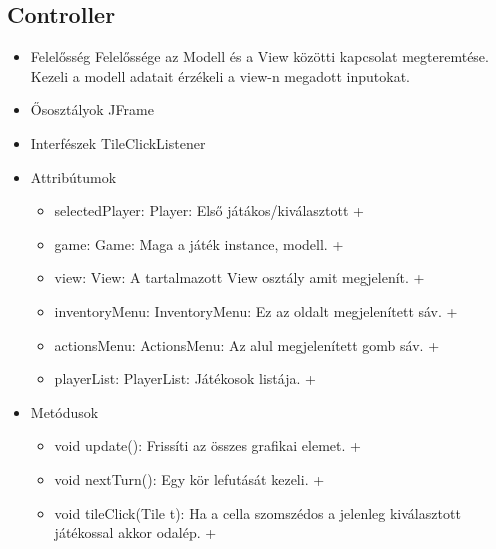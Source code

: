 \subsection{Controller}
\begin{itemize}
	\item Felelősség\newline
	Felelőssége az Modell és a View közötti kapcsolat megteremtése. Kezeli a modell adatait érzékeli a view-n megadott inputokat.
	\item Ősosztályok\newline
	JFrame
	\item Interfészek\newline
	TileClickListener
	\item Attribútumok\newline
	\begin{itemize}
		\item selectedPlayer: Player: Első játákos/kiválasztott +
		\item game: Game: Maga a játék instance, modell. +
		\item view: View: A tartalmazott View osztály amit megjelenít. +
		\item inventoryMenu: InventoryMenu: Ez az oldalt megjelenített sáv. +
		\item actionsMenu: ActionsMenu: Az alul megjelenített gomb sáv. +
		\item playerList: PlayerList: Játékosok listája. +	
	\end{itemize}
	\item Metódusok\newline
	\begin{itemize}
		\item void update(): Frissíti az összes grafikai elemet. +
		\item void nextTurn(): Egy kör lefutását kezeli. +
		\item void tileClick(Tile t): Ha a cella szomszédos a jelenleg kiválasztott játékossal akkor odalép. +
	\end{itemize}
\end{itemize}

